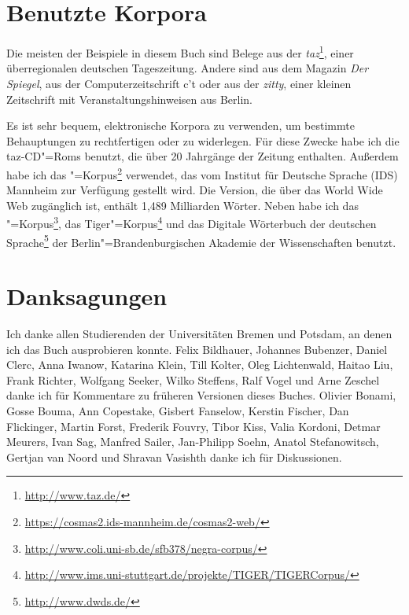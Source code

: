 \section*{Benutzte Korpora}

Die meisten der Beispiele in diesem Buch sind Belege aus der {\em taz}\footnote{
\url{http://www.taz.de/}}, einer überregionalen
deutschen Tageszeitung. Andere sind aus dem Magazin \emph{Der Spiegel},
aus der Computerzeitschrift c't oder aus der \emph{zitty}, einer kleinen Zeitschrift mit
Veranstaltungshinweisen aus Berlin. 


Es ist sehr bequem, elektronische Korpora zu verwenden, um bestimmte Behauptungen zu rechtfertigen
oder zu widerlegen.
Für diese Zwecke habe ich die taz-CD"=Roms benutzt, die über 20 Jahrgänge der Zeitung enthalten.
Außerdem habe ich das \cosmas"=Korpus\footnote{\url{https://cosmas2.ids-mannheim.de/cosmas2-web/}} 
verwendet, das vom Institut für Deutsche Sprache (IDS) Mannheim zur Verfügung gestellt
wird. Die Version, die über das World Wide Web zugänglich ist, enthält 1,489 Milliarden Wörter.
Neben \cosmas habe ich das \negra"=Korpus\footnote{
\url{http://www.coli.uni-sb.de/sfb378/negra-corpus/}}, das
Tiger"=Korpus\footnote{\url{http://www.ims.uni-stuttgart.de/projekte/TIGER/TIGERCorpus/}}
und das Digitale Wörterbuch der deutschen Sprache\footnote{\url{http://www.dwds.de/}} der 
Berlin"=Brandenburgischen Akademie der Wissenschaften benutzt.


\section*{Danksagungen}

Ich danke allen Studierenden der Universitäten Bremen und Potsdam, 
an denen ich das Buch ausprobieren konnte.
Felix Bildhauer,
Johannes Bubenzer, %
Daniel Clerc, %
Anna Iwanow, %
Katarina Klein, 
Till Kolter, 
Oleg Lichtenwald, 
Haitao Liu,
Frank Richter,
Wolfgang Seeker,
Wilko Steffens,
Ralf Vogel
und
Arne Zeschel
danke ich für Kommentare zu früheren Versionen dieses Buches.
Olivier Bonami, %
Gosse Bouma, 
Ann Copestake, 
Gisbert Fanselow, 
Kerstin Fischer, 
Dan Flickinger, 
Martin Forst,
Frederik Fouvry,
Tibor Kiss, 
Valia Kordoni, 
Detmar Meurers, 
Ivan Sag, 
Manfred Sailer,       %
Jan-Philipp Soehn,    %
Anatol Stefanowitsch,
Gertjan van Noord
und
Shravan Vasishth %
danke ich für Diskussionen.

